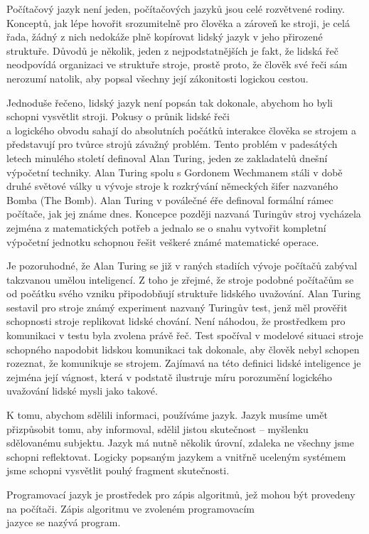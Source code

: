 \documentclass[10pt,twoside=true,open=right,cleardoublepage=empty,chapterprefix=true]{scrbook}
\begin{document}
Počítačový jazyk není jeden, počítačových jazyků jsou celé rozvětvené rodiny. Konceptů, jak lépe hovořit srozumitelně pro člověka a zároveň ke stroji, je celá řada, žádný z nich nedokáže plně kopírovat lidský jazyk v jeho přirozené struktuře. Důvodů je několik, jeden z nejpodstatnějších je fakt, že lidská řeč neodpovídá organizaci ve struktuře stroje, prostě proto, že člověk své řeči sám nerozumí natolik, aby popsal všechny její zákonitosti logickou cestou.

Jednoduše řečeno, lidský jazyk není popsán tak dokonale, abychom ho byli schopni vysvětlit stroji. Pokusy o průnik lidské řeči \\a logického obvodu sahají do absolutních počátků interakce člověka se strojem a představují pro tvůrce strojů závažný problém. Tento problém v padesátých letech minulého století definoval Alan Turing, jeden ze zakladatelů dnešní výpočetní techniky. Alan Turing spolu s Gordonem Wechmanem stáli v době druhé světové války u vývoje stroje k rozkrývání německých šifer nazvaného Bomba (The Bomb). Alan Turing v poválečné éře definoval formální rámec počítače, jak jej známe dnes. Koncepce později nazvaná Turingův stroj vycházela zejména z matematických potřeb a jednalo se o snahu vytvořit kompletní výpočetní jednotku schopnou řešit veškeré známé matematické operace.  


Je pozoruhodné, že Alan Turing se již v raných stadiích vývoje počítačů zabýval takzvanou umělou inteligencí. Z toho je zřejmé, že stroje podobné počítačům se od počátku svého vzniku připodobňují struktuře lidského uvažování. Alan Turing sestavil pro stroje známý experiment nazvaný Turingův test, jenž měl prověřit schopnosti stroje replikovat lidské chování. Není náhodou, že prostředkem pro komunikaci v testu byla zvolena právě řeč. Test spočíval v modelové situaci stroje schopného napodobit lidskou komunikaci tak dokonale, aby člověk nebyl schopen rozeznat, že komunikuje se strojem. Zajímavá na této definici lidské inteligence je zejména její vágnost, která v podstatě ilustruje míru porozumění logického uvažování lidské mysli jako takové.

K tomu, abychom sdělili informaci, používáme jazyk. Jazyk musíme umět přizpůsobit tomu, aby informoval, sdělil jistou skutečnost -- myšlenku sdělovanému subjektu. Jazyk má nutně několik úrovní, zdaleka ne všechny jsme schopni reflektovat. Logicky popsaným jazykem a vnitřně uceleným systémem jsme schopni vysvětlit pouhý fragment skutečnosti.

Programovací jazyk je prostředek pro zápis algoritmů, jež mohou být provedeny na počítači. Zápis algoritmu ve zvoleném programovacím \\jazyce se nazývá program.
\end{document}
